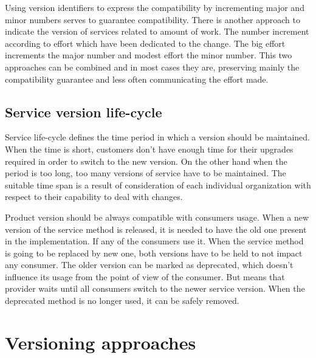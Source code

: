 Using version identifiers to express the compatibility by incrementing major and minor numbers serves to guarantee compatibility. There is another approach to indicate the version of services related to amount of work. The number increment according to effort which have been dedicated to the change. The big effort increments the major number and modest effort the minor number. This two approaches can be combined and in most cases they are, preserving mainly the compatibility guarantee and less often communicating the effort made. \cite{soa-governance}


\subsection{Service version life-cycle}
Service life-cycle defines the time period in which a version should be maintained. When the time is short, customers don't have enough time for their upgrades required in order to switch to the new version. On the other hand when the period is too long, too many versions of service have to be maintained. The suitable time span is a result of consideration of each individual organization with respect to their capability to deal with changes.

Product version should be always compatible with consumers usage. When a new version of the service method is released, it is needed to have the old one present in the implementation. If any of the consumers use it. When the service method is going to be replaced by new one, both versions have to be held to not impact any consumer. The older version can be marked as deprecated, which doesn't influence its usage from the point of view of the consumer. But means that provider waits until all consumers switch to the newer service version. When the deprecated method is no longer used, it can be safely removed. 



\section{Versioning approaches}
\label{sec:versioning-approaches}

